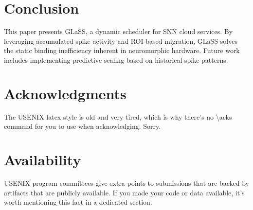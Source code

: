 \documentclass[letterpaper,twocolumn,10pt]{article}
\begin{document}
\section{Conclusion}
This paper presents GLaSS, a dynamic scheduler for SNN cloud services. By leveraging accumulated spike activity and ROI-based migration, GLaSS solves the static binding inefficiency inherent in neuromorphic hardware. Future work includes implementing predictive scaling based on historical spike patterns.


\section*{Acknowledgments}

The USENIX latex style is old and very tired, which is why
there's no \textbackslash{}acks command for you to use when
acknowledging. Sorry.

\section*{Availability}

USENIX program committees give extra points to submissions that are
backed by artifacts that are publicly available. If you made your code
or data available, it's worth mentioning this fact in a dedicated
section.




\end{document}
